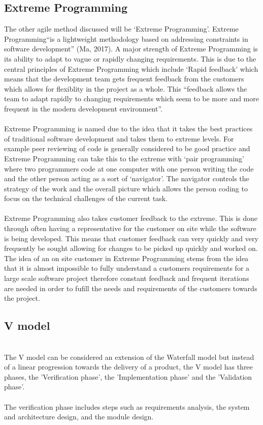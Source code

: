 \documentclass{CRPITStyle}
\begin{document}
		\subsection{Extreme Programming}
		The other agile method discussed will be `Extreme Programming'. Extreme Programming``is a lightweight methodology based on addressing constraints in software development'' (Ma, 2017).  A major strength of Extreme Programming is its ability to adapt to vague or rapidly changing requirements. This is due to the central principles of Extreme Programming which include `Rapid
		feedback' which means that the development team gets frequent feedback from the customers which allows for flexiblity in the project as a whole. This ``feedback
		allows the team to adapt rapidly to changing requirements which seem to be more and more frequent in the modern development environment''.\\
		~\\
		Extreme Programming is named due to the idea that it takes the best practices of traditional software development and takes them to extreme levels. For example
		peer reviewing of code is generally considered to be good practice and Extreme Programming can take this to the extreme with `pair programming' where two programmers code at one computer with one person writing the code and the other person acting as a sort of `navigator'. The navigator controls the strategy of the work and the overall picture which allows the person coding to focus on the technical challenges of the current task.\\
		~\\
		Extreme Programming also takes customer feedback to the extreme. This is done through often having a representative for the customer on site while the software
		is being developed. This means that customer feedback can very quickly and very frequently be sought allowing for changes to be picked up quickly and worked on.
		The idea of an on site customer in Extreme Programming stems from the idea that it is almost impossible to fully understand a customers requirements for a large
		scale software project therefore constant feedback and frequent iterations are needed in order to fufill the needs and requirements of the customers towards the project.
		
		\subsection{V model}~\\
		The V model can be considered an extension of the Waterfall model but instead of a linear progression towards the delivery of a product, the V model has three phases, the 'Verification phase', the 'Implementation phase' and the 'Validation phase'. \\
~\\
The verification phase includes steps such as requirements analysis, the system and architecture design, and the module design.
		
\end{document}
